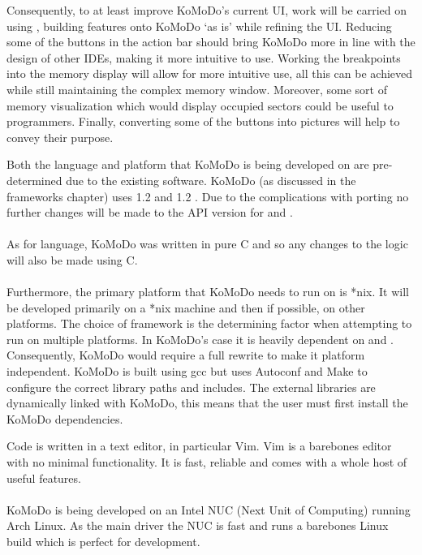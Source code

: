     Consequently, to at least improve KoMoDo's current UI, work will be carried on using , building features onto KoMoDo `as is' while refining the UI. Reducing some of the buttons in the action bar should bring KoMoDo more in line with the design of other IDEs, making it more intuitive to use. Working the breakpoints into the memory display will allow for more intuitive use, all this can be achieved while still maintaining the complex memory window. Moreover, some sort of memory visualization which would display occupied sectors could be useful to programmers. Finally, converting some of the buttons into pictures will help to convey their purpose.

  Both the language and platform that KoMoDo is being developed on are pre-determined due to the existing software. KoMoDo (as discussed in the frameworks chapter) uses  1.2 and  1.2 . Due to the complications with porting no further changes will be made to the API version for  and .\\\\
  As for language, KoMoDo was written in pure C and so any changes to the logic will also be made using C.\\\\
  Furthermore, the primary platform that KoMoDo needs to run on is *nix. It will be developed primarily on a *nix machine and then if possible, on other platforms. The choice of framework is the determining factor when attempting to run on multiple platforms. In KoMoDo's case it is heavily dependent on  and . Consequently, KoMoDo would require a full rewrite to make it platform independent.
  KoMoDo is built using gcc but uses Autoconf and Make to configure the correct library paths and includes. The external libraries are dynamically linked with KoMoDo, this means that the user must first install the KoMoDo dependencies.

  Code is written in a text editor, in particular Vim. Vim is a barebones editor with no minimal functionality. It is fast, reliable and comes with a whole host of useful features.\\\\
  KoMoDo is being developed on an Intel NUC (Next Unit of Computing) running Arch Linux. As the main driver the NUC is fast and runs a barebones Linux build which is perfect for development.


